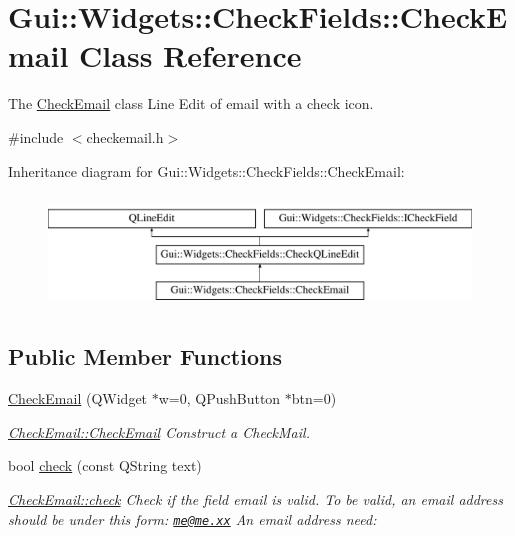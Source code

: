 \hypertarget{classGui_1_1Widgets_1_1CheckFields_1_1CheckEmail}{}\section{Gui\+:\+:Widgets\+:\+:Check\+Fields\+:\+:Check\+Email Class Reference}
\label{classGui_1_1Widgets_1_1CheckFields_1_1CheckEmail}


The \hyperlink{classGui_1_1Widgets_1_1CheckFields_1_1CheckEmail}{Check\+Email} class Line Edit of email with a check icon.  




{\ttfamily \#include $<$checkemail.\+h$>$}

Inheritance diagram for Gui\+:\+:Widgets\+:\+:Check\+Fields\+:\+:Check\+Email\+:\begin{figure}[H]
\begin{center}
\leavevmode
\includegraphics[height=3.000000cm]{d1/d07/classGui_1_1Widgets_1_1CheckFields_1_1CheckEmail}
\end{center}
\end{figure}
\subsection*{Public Member Functions}
\begin{DoxyCompactItemize}
\item 
\hyperlink{classGui_1_1Widgets_1_1CheckFields_1_1CheckEmail_a51694aa43bf0adb2246d0dd9b1d19c0c}{Check\+Email} (Q\+Widget $\ast$w=0, Q\+Push\+Button $\ast$btn=0)
\begin{DoxyCompactList}\small\item\em \hyperlink{classGui_1_1Widgets_1_1CheckFields_1_1CheckEmail_a51694aa43bf0adb2246d0dd9b1d19c0c}{Check\+Email\+::\+Check\+Email} Construct a Check\+Mail. \end{DoxyCompactList}\item 
bool \hyperlink{classGui_1_1Widgets_1_1CheckFields_1_1CheckEmail_a166b7e7d39ca307a52477b2d9ef65ef1}{check} (const Q\+String text)
\begin{DoxyCompactList}\small\item\em \hyperlink{classGui_1_1Widgets_1_1CheckFields_1_1CheckEmail_a166b7e7d39ca307a52477b2d9ef65ef1}{Check\+Email\+::check} Check if the field email is valid. To be valid, an email address should be under this form\+: \href{mailto:me@me.xx}{\tt me@me.\+xx} An email address need\+: \end{DoxyCompactList}\end{DoxyCompactItemize}
